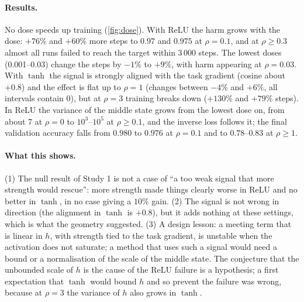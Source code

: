 \paragraph{Results.} No dose speeds up training (\cref{fig:dose}). With ReLU the harm grows with the dose: $+76\%$ and $+60\%$ more steps to $0.97$ and $0.975$ at $\rho=0.1$, and at $\rho\ge0.3$ almost all runs failed to reach the target within 3\,000 steps. The lowest doses (0.001--0.03) change the steps by $-1\%$ to $+9\%$, with harm appearing at $\rho=0.03$. With $\tanh$ the signal is strongly aligned with the task gradient (cosine about $+0.8$) and the effect is flat up to $\rho=1$ (changes between $-4\%$ and $+6\%$, all intervals contain 0), but at $\rho=3$ training breaks down ($+130\%$ and $+79\%$ steps). In ReLU the variance of the middle state grows from the lowest dose on, from about 7 at $\rho=0$ to $10^3$--$10^5$ at $\rho\ge0.1$, and the inverse loss follows it; the final validation accuracy falls from $0.980$ to $0.976$ at $\rho=0.1$ and to $0.78$--$0.83$ at $\rho\ge1$.

\paragraph{What this shows.} (1) The null result of Study 1 is not a case of ``a too weak signal that more strength would rescue'': more strength made things clearly worse in ReLU and no better in $\tanh$, in no case giving a $10\%$ gain. (2) The signal is not wrong in direction (the alignment in $\tanh$ is $+0.8$), but it adds nothing at these settings, which is what the geometry suggested. (3) A design lesson: a meeting term that is linear in $h$, with strength tied to the task gradient, is unstable when the activation does not saturate; a method that uses such a signal would need a bound or a normalisation of the scale of the middle state. The conjecture that the unbounded scale of $h$ is the cause of the ReLU failure is a hypothesis; a first expectation that $\tanh$ would bound $h$ and so prevent the failure was wrong, because at $\rho=3$ the variance of $h$ also grows in $\tanh$.

